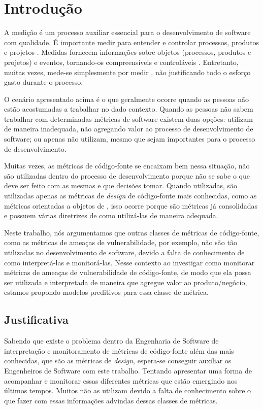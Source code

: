 \chapter{Introdução} \label{cap:introducao}

A medição é um processo auxiliar essencial para o desenvolvimento de software
com qualidade. É importante medir para entender e controlar processos, produtos 
e projetos \cite{ministerio_processo2012}. Medidas fornecem informações sobre 
objetos (processos, produtos e projetos) e eventos, tornando-os compreensíveis 
e controláveis \cite{fenton&pfleenger98}. Entretanto, muitas vezes, mede-se
simplesmente por medir \cite{ministerio_processo2012}, não justificando todo o 
esforço gasto durante o processo.

O cenário apresentado acima é o que geralmente ocorre quando as pessoas não estão
acostumadas a trabalhar no dado contexto. Quando as pessoas não sabem trabalhar
com determinadas métricas de software existem duas opções: utilizam de maneira
inadequada, não agregando valor ao processo de desenvolvimento de software; ou
apenas não utilizam, mesmo que sejam importantes para o processo de
desenvolvimento.

Muitas vezes, as métricas de código-fonte se encaixam bem nessa situação, não
são utilizadas dentro do processo de desenvolvimento porque não se sabe o que
deve ser feito com as mesmas e que decisões tomar. Quando utilizadas, são
utilizadas apenas as métricas de \textit{design} de código-fonte mais
conhecidas, como as métricas orientadas a objetos de
, isso ocorre porque são métricas já
consolidadas e possuem várias diretrizes de como utilizá-las de maneira
adequada. 

Neste trabalho, nós argumentamos que outras classes de métricas de código-fonte,
como as métricas de ameaças de vulnerabilidade, por exemplo, não são tão
utilizadas no desenvolvimento de software, devido a falta de conhecimento de
como interpretá-las e monitorá-las. Nesse contexto ao investigar como monitorar
métricas de ameaças de vulnerabilidade de código-fonte, de modo que ela possa
ser utilizada e interpretada de maneira que agregue valor ao produto/negócio,
estamos propondo modelos preditivos para essa classe de métrica.

\section{Justificativa}

Sabendo que existe o problema dentro da Engenharia de Software de interpretação
e monitoramento de métricas de código-fonte além das mais conhecidas, que são 
as métricas de \textit{design}, espera-se conseguir auxiliar os 
Engenheiros de Software com este trabalho. Tentando apresentar uma forma de
acompanhar e monitorar essas diferentes métricas que estão emergindo
nos últimos tempos. Muitos não as utilizam devido a falta de conhecimento sobre
o que fazer com essas informações advindas dessas classes de métricas.

